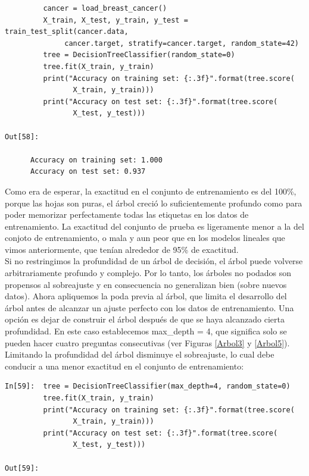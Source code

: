 {\begin{lstlisting}
         cancer = load_breast_cancer()
         X_train, X_test, y_train, y_test = train_test_split(cancer.data,
              cancer.target, stratify=cancer.target, random_state=42)
         tree = DecisionTreeClassifier(random_state=0)
         tree.fit(X_train, y_train)
         print("Accuracy on training set: {:.3f}".format(tree.score(
                X_train, y_train)))
         print("Accuracy on test set: {:.3f}".format(tree.score(
                X_test, y_test)))

Out[58]:

      Accuracy on training set: 1.000
      Accuracy on test set: 0.937

\end{lstlisting}


Como era de esperar, la exactitud en el conjunto de entrenamiento es del 100\%, porque las hojas son puras, el árbol creció lo suficientemente profundo como para poder memorizar perfectamente todas las etiquetas en los datos de entrenamiento. La exactitud del conjunto de prueba es ligeramente menor a la del conjoto de entrenamiento, o mala y aun peor que en los modelos lineales que vimos anteriormente, que tenían alrededor de 95\% de exactitud.\\


Si no restringimos la profundidad de un árbol de decisión, el árbol puede volverse arbitrariamente profundo
y complejo. Por lo tanto, los árboles no podados son propensos al sobreajuste y en consecuencia no generalizan
bien (sobre nuevos datos).  Ahora apliquemos la poda previa al árbol, que limita el desarrollo
del árbol antes de alcanzar un ajuste perfecto con los datos de entrenamiento.  Una opción es dejar de construir el árbol después de que se haya alcanzado cierta profundidad. En este caso establecemos {\ttfamily max\_depth} = 4, que significa solo se pueden hacer cuatro preguntas consecutivas (ver Figuras \ref{Arbol3} y \ref{Arbol5}). Limitando la profundidad del árbol disminuye el sobreajuste, lo cual debe conducir a una menor exactitud en el conjunto de entrenamiento:\\


\begin{lstlisting}
In[59]:  tree = DecisionTreeClassifier(max_depth=4, random_state=0)
         tree.fit(X_train, y_train)
         print("Accuracy on training set: {:.3f}".format(tree.score(
                X_train, y_train)))
         print("Accuracy on test set: {:.3f}".format(tree.score(
                X_test, y_test)))

Out[59]:


\end{lstlisting}}
